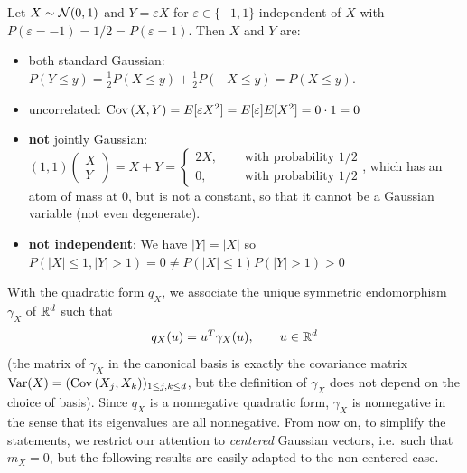 \begin{counterexample} \label{chap1.2:counterexample-uncorrelated_not_independent}
Let $X \sim \mathcal{N}(0,1)$ and $Y = \varepsilon X$ for $\varepsilon \in \{-1,1\}$ independent of $X$ with $P(\varepsilon = -1) = 1/2 = P(\varepsilon = 1)$. Then $X$ and $Y$ are:
\begin{itemize}
    \item both standard Gaussian: $P(Y \leq y)=\frac12P(X \leq y) + \frac12 P(-X \leq y)=P(X \leq y)$.
    \item uncorrelated: $\operatorname{Cov}\left(X, Y\right)=E[\varepsilon X^2]=E[\varepsilon]E[X^2]=0\cdot1=0$
    \item \textbf{not} jointly Gaussian: $(1,1)\begin{pmatrix}X \\ Y\end{pmatrix}=X+Y=\begin{cases}2X, \quad &\text{ with probability 1/2} \\ 0, \quad &\text{ with probability 1/2}\end{cases}$, which has an atom of mass at $0$, but is not a constant, so that it cannot be a Gaussian variable (not even degenerate).
    \item \textbf{not independent}: We have $|Y|=|X|$ so $P(|X| \leq 1, |Y|>1)=0 \neq P(|X|\leq1)P(|Y| >1)>0$ 
\end{itemize}
\end{counterexample}

With the quadratic form $q_X$, we associate the unique symmetric endomorphism $\gamma_X$ of $\mathbb{R}^d$ such that
$$q_X(u)=u^T\gamma_X(u), \qquad u \in \mathbb{R}^d$$
(the matrix of $\gamma_X$ in the canonical basis is exactly the covariance matrix $\operatorname{Var}(X)=(\operatorname{Cov}\left(X_j, X_k\right))_{1\leq j,k \leq d}$, but the definition of $\gamma_X$ does not depend on the choice of basis). Since $q_X$ is a nonnegative quadratic form, $\gamma_X$ is nonnegative in the sense that its eigenvalues are all nonnegative. From now on, to simplify the statements, we restrict our attention to \textit{centered} Gaussian vectors, i.e.\ such that $m_X=0$, but the following results are easily adapted to the non-centered case.

